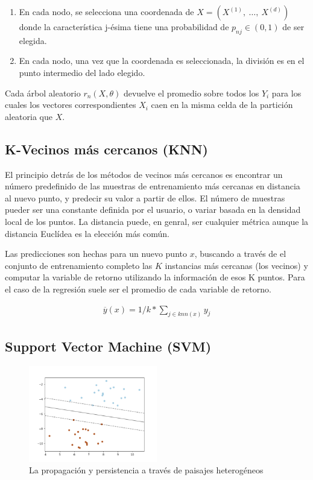 \begin{enumerate}
  \item En cada nodo, se selecciona una coordenada de $X = (X^{(1)}, \ \dots,\ X^{(d)})$
        donde la característica j-ésima tiene una probabilidad de $p_{nj} \in (0,1)$
        de ser elegida.
  \item En cada nodo, una vez que la coordenada es seleccionada, la división es
        en el punto intermedio del lado elegido.
\end{enumerate}
Cada árbol aleatorio $r_{n}(X, \theta)$ devuelve el promedio sobre todos los
$Y_{i}$ para los cuales los vectores correspondientes $X_{i}$ caen en la misma
celda de la partición aleatoria que $X$.


\subsection{K-Vecinos más cercanos (KNN)}
El principio detrás de los métodos de vecinos más cercanos es encontrar un
número predefinido de las muestras de entrenamiento más cercanas en distancia
al nuevo punto, y predecir su valor a partir de ellos.
El número de muestras pueder ser una constante definida por el usuario, o
variar basada en la densidad local de los puntos. La distancia puede, en genral,
ser cualquier métrica aunque la distancia Euclídea es la elección más común.

Las predicciones son hechas para un nuevo punto $x$, buscando a través de el conjunto
de entrenamiento completo las $K$ instancias más cercanas (los vecinos) y computar
la variable de retorno utilizando la información de esos K puntos. Para el caso
de la regresión suele ser el promedio de cada variable de retorno.

\begin{align}
  \overline{y}(x) = 1/k * \sum_{j \in knn(x)} y_{j}
\end{align}



\subsection{Support Vector Machine (SVM)}

  \begin{figure}
  \centering%
  \includegraphics[width=0.5\textwidth]{images/svm_hiperplane}%
  \caption{La propagación y persistencia a través de paisajes heterogéneos}\label{fig:svm}
  \end{figure}

